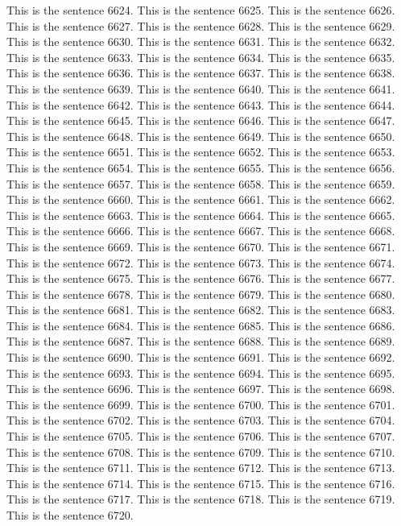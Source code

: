 \documentclass{article}
\begin{document}
This is the sentence 6624.
This is the sentence 6625.
This is the sentence 6626.
This is the sentence 6627.
This is the sentence 6628.
This is the sentence 6629.
This is the sentence 6630.
This is the sentence 6631.
This is the sentence 6632.
This is the sentence 6633.
This is the sentence 6634.
This is the sentence 6635.
This is the sentence 6636.
This is the sentence 6637.
This is the sentence 6638.
This is the sentence 6639.
This is the sentence 6640.
This is the sentence 6641.
This is the sentence 6642.
This is the sentence 6643.
This is the sentence 6644.
This is the sentence 6645.
This is the sentence 6646.
This is the sentence 6647.
This is the sentence 6648.
This is the sentence 6649.
This is the sentence 6650.
This is the sentence 6651.
This is the sentence 6652.
This is the sentence 6653.
This is the sentence 6654.
This is the sentence 6655.
This is the sentence 6656.
This is the sentence 6657.
This is the sentence 6658.
This is the sentence 6659.
This is the sentence 6660.
This is the sentence 6661.
This is the sentence 6662.
This is the sentence 6663.
This is the sentence 6664.
This is the sentence 6665.
This is the sentence 6666.
This is the sentence 6667.
This is the sentence 6668.
This is the sentence 6669.
This is the sentence 6670.
This is the sentence 6671.
This is the sentence 6672.
This is the sentence 6673.
This is the sentence 6674.
This is the sentence 6675.
This is the sentence 6676.
This is the sentence 6677.
This is the sentence 6678.
This is the sentence 6679.
This is the sentence 6680.
This is the sentence 6681.
This is the sentence 6682.
This is the sentence 6683.
This is the sentence 6684.
This is the sentence 6685.
This is the sentence 6686.
This is the sentence 6687.
This is the sentence 6688.
This is the sentence 6689.
This is the sentence 6690.
This is the sentence 6691.
This is the sentence 6692.
This is the sentence 6693.
This is the sentence 6694.
This is the sentence 6695.
This is the sentence 6696.
This is the sentence 6697.
This is the sentence 6698.
This is the sentence 6699.
This is the sentence 6700.
This is the sentence 6701.
This is the sentence 6702.
This is the sentence 6703.
This is the sentence 6704.
This is the sentence 6705.
This is the sentence 6706.
This is the sentence 6707.
This is the sentence 6708.
This is the sentence 6709.
This is the sentence 6710.
This is the sentence 6711.
This is the sentence 6712.
This is the sentence 6713.
This is the sentence 6714.
This is the sentence 6715.
This is the sentence 6716.
This is the sentence 6717.
This is the sentence 6718.
This is the sentence 6719.
This is the sentence 6720.
\end{document}
